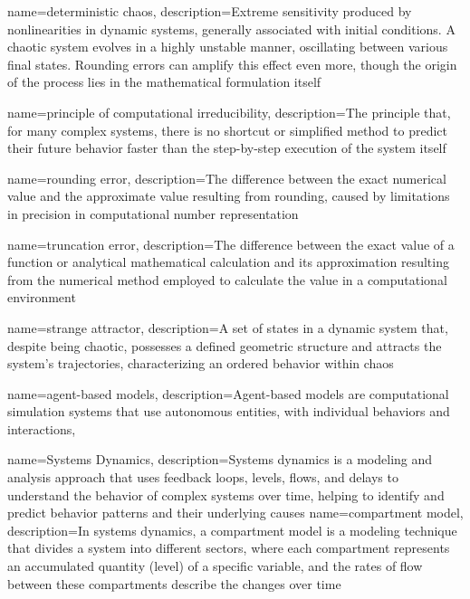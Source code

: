 {
    name=deterministic chaos,
    description={Extreme sensitivity produced by nonlinearities in dynamic systems, generally associated with initial conditions. A chaotic system evolves in a highly unstable manner, oscillating between various final states. Rounding errors can amplify this effect even more, though the origin of the process lies in the mathematical formulation itself}
}

{
    name=principle of computational irreducibility,
    description={The principle that, for many complex systems, there is no shortcut or simplified method to predict their future behavior faster than the step-by-step execution of the system itself}
}

{
    name=rounding error,
    description={The difference between the exact numerical value and the approximate value resulting from rounding, caused by limitations in precision in computational number representation}
}

{
    name=truncation error,
    description={The difference between the exact value of a function or analytical mathematical calculation and its approximation resulting from the numerical method employed to calculate the value in a computational environment}
}

{
    name=strange attractor,
    description={A set of states in a dynamic system that, despite being chaotic, possesses a defined geometric structure and attracts the system’s trajectories, characterizing an ordered behavior within chaos}
}

{
    name=agent-based models,
    description={Agent-based models are computational simulation systems that use autonomous entities, with individual behaviors and interactions,}
}

{
    name=Systems Dynamics,
    description={Systems dynamics is a modeling and analysis approach that uses feedback loops, levels, flows, and delays to understand the behavior of complex systems over time, helping to identify and predict behavior patterns and their underlying causes}
}
{
    name=compartment model,
    description={In systems dynamics, a compartment model is a modeling technique that divides a system into different sectors, where each compartment represents an accumulated quantity (level) of a specific variable, and the rates of flow between these compartments describe the changes over time}
}

